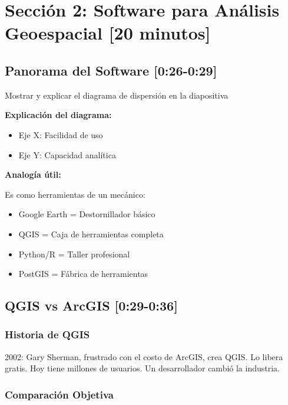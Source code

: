 \documentclass[11pt,a4paper]{article}
\newcommand{\tiempo}[1]{\textcolor{timecolor}{\textbf{[#1]}}}
\newcommand{\decir}[1]{\begin{tcolorbox}[colback=blue!5,colframe=usachblue,title={DECIR}]#1\end{tcolorbox}}
\newcommand{\hacer}[1]{\begin{tcolorbox}[colback=green!5,colframe=green!50!black,title={HACER}]#1\end{tcolorbox}}
\begin{document}
\newpage

\section{Sección 2: Software para Análisis Geoespacial \tiempo{20 minutos}}

\subsection{Panorama del Software \tiempo{0:26-0:29}}

\hacer{Mostrar y explicar el diagrama de dispersión en la diapositiva}

\textbf{Explicación del diagrama:}
\begin{itemize}
    \item Eje X: Facilidad de uso
    \item Eje Y: Capacidad analítica
\end{itemize}

\textbf{Analogía útil:}

\decir{Es como herramientas de un mecánico:
\begin{itemize}
    \item Google Earth = Destornillador básico
    \item QGIS = Caja de herramientas completa
    \item Python/R = Taller profesional
    \item PostGIS = Fábrica de herramientas
\end{itemize}}

\subsection{QGIS vs ArcGIS \tiempo{0:29-0:36}}

\subsubsection{Historia de QGIS}

\decir{2002: Gary Sherman, frustrado con el costo de ArcGIS, crea QGIS. Lo libera gratis. Hoy tiene millones de usuarios. Un desarrollador cambió la industria.}

\subsubsection{Comparación Objetiva}
\end{document}
